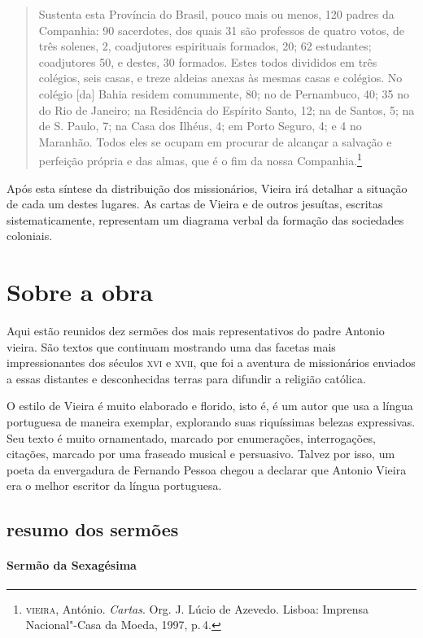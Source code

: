\begin{quote}
Sustenta esta Província do Brasil, pouco mais ou menos, 120 padres da
Companhia: 90 sacerdotes, dos quais 31 são professos de quatro votos, de
três solenes, 2, coadjutores espirituais formados, 20; 62 estudantes;
coadjutores 50, e destes, 30 formados. Estes todos divididos em três
colégios, seis casas, e treze aldeias anexas às mesmas casas e colégios.
No colégio {[}da{]} Bahia residem comummente, 80; no de Pernambuco, 40;
35 no do Rio de Janeiro; na Residência do Espírito Santo, 12; na de
Santos, 5; na de S. Paulo, 7; na Casa dos Ilhéus, 4; em Porto Seguro, 4;
e 4 no Maranhão. Todos eles se ocupam em procurar de alcançar a salvação
e perfeição própria e das almas, que é o fim da nossa
Companhia.\footnote{\textsc{vieira}, António. \textit{Cartas}. Org. J. Lúcio de Azevedo.
  Lisboa: Imprensa Nacional"-Casa da Moeda, 1997, p.\,4.}
\end{quote}

Após esta síntese da distribuição dos missionários, Vieira irá detalhar
a situação de cada um destes lugares. As cartas de Vieira e de outros
jesuítas, escritas sistematicamente, representam um diagrama verbal da
formação das sociedades coloniais.

\section{Sobre a obra}

Aqui estão reunidos dez sermões dos mais representativos do padre Antonio vieira.
São textos que continuam mostrando uma das facetas mais impressionantes dos
séculos \textsc{xvi} e \textsc{xvii}, que foi a aventura de missionários enviados a essas
distantes e desconhecidas terras para difundir a religião católica.

O estilo de Vieira é muito elaborado e florido, isto é, é um autor que
usa a língua portuguesa de maneira exemplar, explorando suas riquíssimas
belezas expressivas. Seu texto é muito ornamentado, marcado por
enumerações, interrogações, citações, marcado por uma fraseado musical e
persuasivo. Talvez por isso, um poeta da envergadura de Fernando Pessoa chegou a declarar que Antonio Vieira era o melhor escritor da língua portuguesa.

\subsection{resumo dos sermões}

\paragraph{Sermão da Sexagésima}

